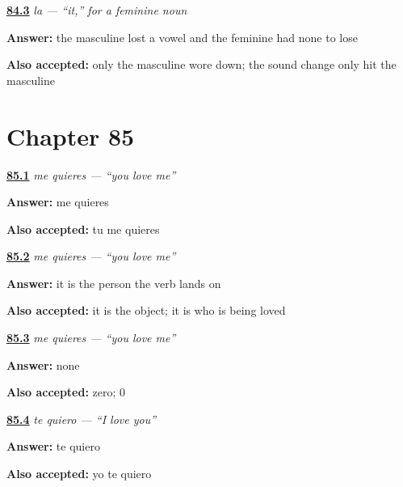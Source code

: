 \noindent\begin{minipage}[t]{\linewidth}
\raggedright
\hyperlink{review-ES-C42-la-why}{\textbf{84.3}} \emph{la — \textquotedblleft{}it,\textquotedblright{} for a feminine noun}\par
\small \textbf{Answer:} the masculine lost a vowel and the feminine had none to lose\par
\footnotesize \textbf{Also accepted:} only the masculine wore down; the sound change only hit the masculine
\end{minipage}\par\medskip

\section*{Chapter 85}

\noindent\begin{minipage}[t]{\linewidth}
\raggedright
\hyperlink{review-ES-C42-me-objeto-say}{\textbf{85.1}} \emph{me quieres — \textquotedblleft{}you love me\textquotedblright{}}\par
\small \textbf{Answer:} me quieres\par
\footnotesize \textbf{Also accepted:} tu me quieres
\end{minipage}\par\medskip

\noindent\begin{minipage}[t]{\linewidth}
\raggedright
\hyperlink{review-ES-C42-me-objeto-difference}{\textbf{85.2}} \emph{me quieres — \textquotedblleft{}you love me\textquotedblright{}}\par
\small \textbf{Answer:} it is the person the verb lands on\par
\footnotesize \textbf{Also accepted:} it is the object; it is who is being loved
\end{minipage}\par\medskip

\noindent\begin{minipage}[t]{\linewidth}
\raggedright
\hyperlink{review-ES-C42-me-objeto-new}{\textbf{85.3}} \emph{me quieres — \textquotedblleft{}you love me\textquotedblright{}}\par
\small \textbf{Answer:} none\par
\footnotesize \textbf{Also accepted:} zero; 0
\end{minipage}\par\medskip

\noindent\begin{minipage}[t]{\linewidth}
\raggedright
\hyperlink{review-ES-C42-te-say}{\textbf{85.4}} \emph{te quiero — \textquotedblleft{}I love you\textquotedblright{}}\par
\small \textbf{Answer:} te quiero\par
\footnotesize \textbf{Also accepted:} yo te quiero
\end{minipage}\par\medskip

